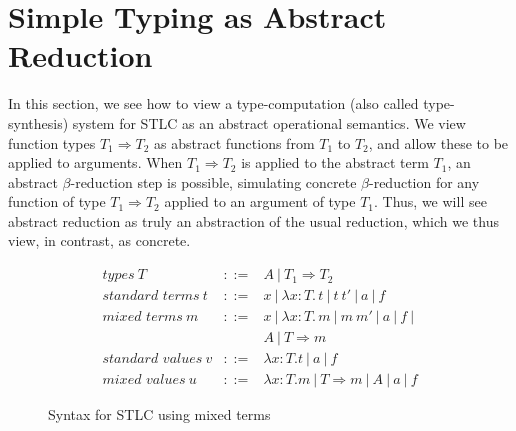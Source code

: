 \documentclass{LMCS}
\newcommand{\To}[0]{\Rightarrow}
\begin{document}
\section{Simple Typing as Abstract Reduction}
\label{sec:restlc}

In this section, we see how to view a type-computation (also called
type-synthesis) system for STLC as an abstract operational semantics.
We view function types $T_1\To T_2$ as abstract functions from $T_1$
to $T_2$, and allow these to be applied to arguments.  When $T_1\To
T_2$ is applied to the abstract term $T_1$, an abstract
$\beta$-reduction step is possible, simulating concrete
$\beta$-reduction for any function of type $T_1\To T_2$ applied to an
argument of type $T_1$.  Thus, we will see abstract reduction as truly
an abstraction of the usual reduction, which we thus view, in
contrast, as concrete.

\begin{figure}
\[
\begin{array}{lll}
\textit{types}\ T & ::= & A\ |\ T_1\To T_2\\
\textit{standard terms}\ t & ::= & x\ |\ \lambda x:T.\,t\ |\ t\ t'\ |\ a\ |\ f \\
\textit{mixed terms}\ m & ::= & x\ |\ \lambda x:T.\,m\ |\ m\ m'\ |\ a\ |\ f\ | \\
\ &\ & A\ |\ T\To m \\
\textit{standard values}\ v & ::= & \lambda x:T.t\ |\ a\ |\ f \\
\textit{mixed values}\ u & ::= & \lambda x:T.m\ |\ T\To m\ |\ A\ |\ a\ |\ f
\end{array}
\]
\caption{Syntax for STLC using mixed terms}
\label{fig:synrestlc}
\end{figure}
\end{document}
